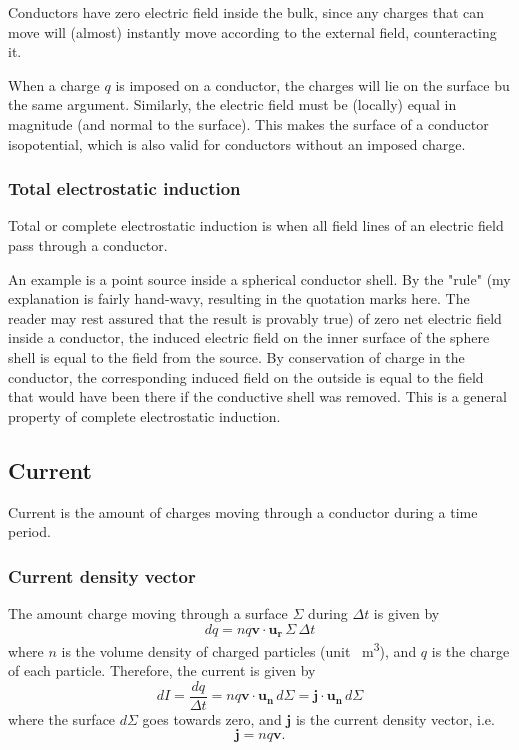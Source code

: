 \documentclass[a4paper, 12pt]{article}
\renewcommand{\vec}[1]{\mathbf{#1}}
\renewcommand{\j}{\ensuremath{\vec{j}}}
\begin{document}
        Conductors have zero electric field inside the bulk, 
        since any charges that can move will (almost) instantly move according to the external field, counteracting it. 
        
        When a charge $q$ is imposed on a conductor, the charges will lie on the surface bu the same argument. 
        Similarly, the electric field must be (locally) equal in magnitude (and normal to the surface). 
        This makes the surface of a conductor isopotential, which is also valid for conductors without an imposed charge. 

    \subsubsection{Total electrostatic induction}
        Total or complete electrostatic induction is when all field lines of an electric field pass through a conductor.
        
        An example is a point source inside a spherical conductor shell. 
        By the "rule" (my explanation is fairly hand-wavy, resulting in the quotation marks here. 
        The reader may rest assured that the result is provably true) of zero net electric field inside a conductor, 
        the induced electric field on the inner surface of the sphere shell is equal to the field from the source. 
        By conservation of charge in the conductor, 
        the corresponding induced field on the outside is equal to the field that would have been there if the conductive shell was removed. 
        This is a general property of complete electrostatic induction. 
  
\subsection{Current}
    Current is the amount of charges moving through a conductor during a time period. 
    \subsubsection{Current density vector}
        The amount charge moving through a surface $\Sigma$ during $\Delta t$ is given by
        \begin{equation}
            dq = nq\vec{v}\cdot \vec{u_r}\,\Sigma \,\Delta t
        \end{equation}
        where $n$ is the volume density of charged particles (unit \si{\per\metre\cubed}), and $q$ is the charge of each particle.
        Therefore, the current is given by
        \begin{equation}
            dI = \frac{dq}{\Delta t} = nq\vec{v}\cdot\vec{u_n}\,d\Sigma = \j\cdot\vec{u_n}\,d\Sigma
        \end{equation}
        where the surface $d\Sigma$ goes towards zero, and $\j$ is the current density vector, i.e.
        \begin{equation}
            \j = nq\vec{v}.
        \end{equation}
        
\end{document}
